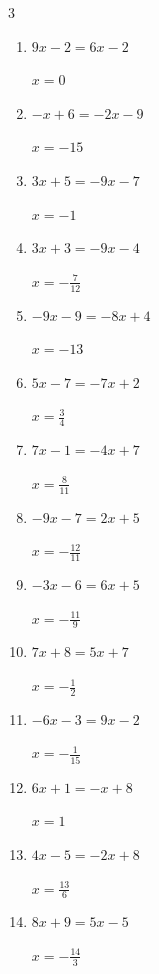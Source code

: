 \begin{multicols}{3}
\begin{enumerate}
        $\displaystyle x=-\frac{8}{9}$

  \item $9x-2=6x-2$

        $\displaystyle x=0$

  \item $-x+6=-2x-9$

        $\displaystyle x=-15$

  \item $3x+5=-9x-7$

        $\displaystyle x=-1$

  \item $3x+3=-9x-4$

        $\displaystyle x=-\frac{7}{12}$

  \item $-9x-9=-8x+4$

        $\displaystyle x=-13$

\columnbreak %

  \item $5x-7=-7x+2$

        $\displaystyle x=\frac{3}{4}$

  \item $7x-1=-4x+7$

        $\displaystyle x=\frac{8}{11}$

  \item $-9x-7=2x+5$

        $\displaystyle x=-\frac{12}{11}$

  \item $-3x-6=6x+5$

        $\displaystyle x=-\frac{11}{9}$

  \item $7x+8=5x+7$

        $\displaystyle x=-\frac{1}{2}$

  \item $-6x-3=9x-2$

        $\displaystyle x=-\frac{1}{15}$

  \item $6x+1=-x+8$

        $\displaystyle x=1$

  \item $4x-5=-2x+8$

        $\displaystyle x=\frac{13}{6}$

  \item $8x+9=5x-5$

        $\displaystyle x=-\frac{14}{3}$


\end{enumerate}
\end{multicols}
